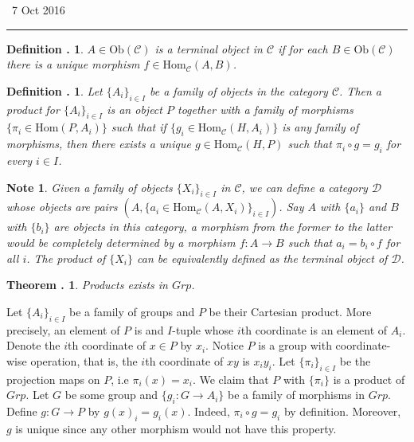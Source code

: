 \documentclass[twoside]{report}
\newcommand{\Ob}{\textrm{Ob}}
\newcommand{\Hom}{\textrm{Hom}}
\newcommand{\fanC}{\mathscr{C}}
\newcommand{\fanD}{\mathscr{D}}
\newcounter{Lecture}
\newcommand{\newLec}[1]{
  \stepcounter{Lecture}
  \noindent{\Large\bf Lecture \arabic{Lecture}} \, #1 \hfill  \rule[1ex]{2.5in}{.1pt} \vspace{1em}
}
\theoremstyle{myts}
\newcounter{c}[Lecture]
\newtheorem{dfn}[c]{Definition \arabic{Lecture}.}
\newtheorem{thm}[c]{Theorem \arabic{Lecture}.}
\newtheorem*{nte}{Note}
\newcounter{ex}[Lecture]
\newenvironment{prf}{
  \noindent\begin{mdframed}[style=prf]}{\end{mdframed} \vspace{1em}
}
\begin{document}
\newLec{7 Oct 2016}

\begin{dfn}
  \( A\in \Ob(\fanC) \) is a \emph{terminal object} in $\fanC$ if for each \( B\in\Ob(\fanC) \) there is a unique morphism \( f\in\Hom_\fanC(A,B) \).
\end{dfn}

\begin{dfn}
  Let \( \{ A_i \}_{ i\in I} \) be a family of objects in the category $\fanC$. Then a product for \( \{ A_i \}_{ i\in I} \) is an object $P$ together with a family of morphisms \( \{ \pi_i \in \Hom (P, A_i) \} \) such that if \( \{ g_i \in \Hom_\fanC(H,A_i) \} \) is any family of morphisms, then there exists a unique \( g\in \Hom_\fanC (H,P) \) such that \( \pi_i \circ g = g_i \) for every \(i\in I\).
\end{dfn}

\begin{nte}
  Given a family of objects \( \{ X_i \}_{i\in I} \) in $\fanC$, we can define a category $\fanD$ whose objects are pairs \( \left( A, \{ a_i \in\Hom_\fanC(A,X_i) \}_{i\in I} \right) \). Say $A$ with \( \{ a_i \} \) and $B$ with \( \{ b_i \} \) are objects in this category, a morphism from the former to the latter would be completely determined by a morphism \(f:A\to B\) such that \( a_i = b_i \circ f \) for all $i$. The product of \(\{ X_i \} \) can be equivalently defined as the terminal object of $\fanD$.
\end{nte}

\begin{thm}
  Products exists in $Grp$.
\end{thm}

\begin{prf}
  Let \( \{ A_i \}_{i\in I} \) be a family of groups and $P$ be their Cartesian product. More precisely, an element of $P$ is and $I$-tuple whose $i$th coordinate is an element of $A_i$. Denote the $i$th coordinate of \( x\in P \) by \(x_i\). Notice $P$ is a group with coordinate-wise operation, that is, the $i$th coordinate of $xy$ is $x_iy_i$. Let \( \{\pi_i\}_{i\in I} \) be the projection maps on $P$, i.e \( \pi_i(x) = x_i \). We claim that $P$ with \(\{\pi_i\}\) is a product of $Grp$. Let $G$ be some group and \(\{g_i:G\to A_i\}\) be a family of morphisms in $Grp$. Define \(g : G\to P\)  by \( g(x)_i = g_i(x) \). Indeed, \( \pi_i \circ g = g_i \) by definition. Moreover, $g$ is unique since any other morphism would not have this property.
\end{prf}
\end{document}
